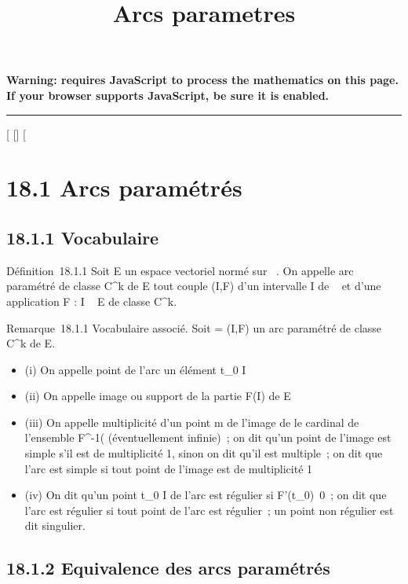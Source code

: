 \documentclass[]{article}
\title{Arcs parametres}
\author{}
\date{}
\begin{document}
\maketitle

\textbf{Warning: 
requires JavaScript to process the mathematics on this page.\\ If your
browser supports JavaScript, be sure it is enabled.}

\begin{center}\rule{3in}{0.4pt}\end{center}

[
[]
[

\section{18.1 Arcs paramétrés}

\subsection{18.1.1 Vocabulaire}

Définition~18.1.1 Soit E un espace vectoriel normé sur ~. On appelle arc
paramétré de classe C^k de E tout couple (I,F) d'un
intervalle I de ~ et d'une application F : I \rightarrow~ E de classe
C^k.

Remarque~18.1.1 Vocabulaire associé. Soit \Gamma = (I,F) un arc paramétré de
classe C^k de E.

\begin{itemize}
\itemsep1pt\parskip0pt
\item
  (i) On appelle point de l'arc \Gamma un élément t_0 \in I
\item
  (ii) On appelle image ou support de \Gamma la partie F(I) de E
\item
  (iii) On appelle multiplicité d'un point m de l'image de \Gamma le cardinal
  de l'ensemble F^-1(\m\)
  (éventuellement infinie)~; on dit qu'un point de l'image est simple
  s'il est de multiplicité 1, sinon on dit qu'il est multiple~; on dit
  que l'arc est simple si tout point de l'image est de multiplicité 1
\item
  (iv) On dit qu'un point t_0 \in I de l'arc \Gamma est régulier si
  F'(t_0)\neq~0~; on dit que l'arc est
  régulier si tout point de l'arc est régulier~; un point non régulier
  est dit singulier.
\end{itemize}

\subsection{18.1.2 Equivalence des arcs paramétrés}
\end{document}
